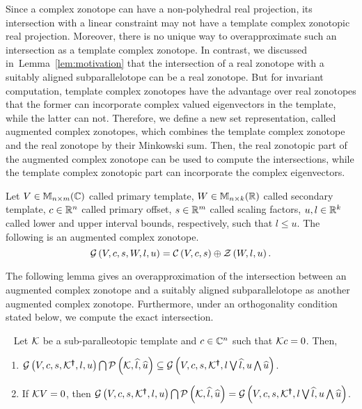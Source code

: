 Since a complex zonotope can have a non-polyhedral real projection,
its intersection with a linear constraint may not have a template
complex zonotopic real projection.  Moreover, there is no unique way
to overapproximate such an intersection as a template complex
zonotope.  In contrast, we discussed in~Lemma~\ref{lem:motivation}
that the intersection of a real zonotope with a suitably aligned
subparallelotope can be a real zonotope.  But for invariant
computation, template complex zonotopes have the advantage over real
zonotopes that the former can incorporate complex valued eigenvectors
in the template, while the latter can not.  Therefore, we define a new
set representation, called augmented complex zonotopes, which combines
the template complex zonotope and the real zonotope by their Minkowski
sum.  Then, the real zonotopic part of the augmented complex zonotope
can be used to compute the intersections, while the template complex
zonotopic part can incorporate the complex eigenvectors.
%
\begin{definition}
Let $V\in\mathbb{M}_{n\times m}(\mathbb{C})$ called primary template, $W\in\mathbb{M}_{n\times k}(\mathbb{R})$
called secondary template, $c\in\mathbb{R}^n$ called primary offset,
$s\in\mathbb{R}^m$ called scaling factors, $u,l\in\mathbb{R}^k$ called lower
and upper interval bounds, respectively, such that $l\leq u$.  The
following is an augmented complex
zonotope.
\begin{equation*}
\mathcal{G}\left(V,c,s,W,l,u\right) = \mathcal{C}\left(V,c,s\right)\oplus\mathcal{Z}\left(W,l,u\right).
\end{equation*}
\end{definition}
%
The following lemma gives an overapproximation of the intersection
between an augmented complex zonotope and a suitably aligned
subparallelotope as another augmented complex zonotope.  Furthermore,
under an orthogonality condition stated below, we compute the exact
intersection.
%
\begin{lemma}~\label{lem:acz-int}
Let $\mathcal{K}$ be a sub-paralleotopic template and $c\in\mathbb{C}^n$
such that $\mathcal{K} c=0$.  Then,
\begin{enumerate}
\item
  $\mathcal{G}\left(V,c,s,\mathcal{K}^{\bm{\dagger}},l,u\right)\bigcap\mathcal{P}\left(\mathcal{K},\widehat{l},\widehat{u}\right)\subseteq
  \mathcal{G}\left(V,c,s,\mathcal{K}^{\bm{\dagger}},l\bigvee\widehat{l},u\bigwedge\widehat{u}\right)$.
\item If $\mathcal{K} V=0$, then $\mathcal{G}\left(V,c,s,\mathcal{K}^{\bm{\dagger}},l,u\right)\bigcap\mathcal{P}\left(\mathcal{K},\widehat{l},\widehat{u}\right)=
  \mathcal{G}\left(V,c,s,\mathcal{K}^{\bm{\dagger}},l\bigvee\widehat{l},u\bigwedge\widehat{u}\right)$.
\end{enumerate}
\end{lemma}
